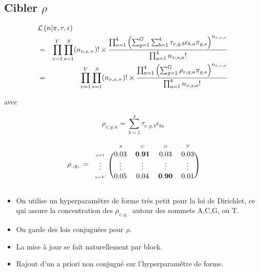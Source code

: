 \documentclass{beamer}
\begin{document}
\subsection{Cibler $\rho$}

\begin{frame}


\begin{eqnarray*}\lefteqn{\mathcal{L}\left(n | \pi, \tau,\epsilon \right)}\nonumber\\& =& \prod_{v=1}^{V} \prod_{s = 1}^{S} (n_{v,s,+})!\times\frac{\prod_{a = 1}^{4} \left( \sum_{g = 1}^{G}\sum_{b=1}^{4} \tau_{v,g,b}\epsilon_{b,a} \pi_{g,s}  \right)^{n_{v,s,a}}}{\prod_{a = 1}^{4}n_{v,s,a}!}\nonumber\\
& =&\prod_{v=1}^{V} \prod_{s = 1}^{S} (n_{v,s,+})!\times\frac{\prod_{a = 1}^{4} \left( \sum_{g = 1}^{G} \rho_{v,g,a} \pi_{g,s}  \right)^{n_{v,s,a}}}{\prod_{a = 1}^{4}n_{v,s,a}!}\end{eqnarray*}

avec

$$\rho_{v,g,a}=\sum_{b=1}^4\tau_{v,g,b}\epsilon_{ba}$$
\end{frame}
\begin{frame}
 $$\rho_{.,g,.}=\begin{blockarray}{ccccc}
    &\scriptscriptstyle A&\scriptscriptstyle C&\scriptscriptstyle G&\scriptscriptstyle T\\
    \begin{block}{c(cccc)}
 {\scriptscriptstyle v=1}&0.03&\mathbf{0.91}&0.03&0.03\\   
 {\scriptscriptstyle 
 \vdots}&\vdots&\vdots&\vdots&\vdots\\   
  {\scriptscriptstyle 
 v=V}&0.05&0.04&\mathbf{0.90}&0.01\\   
    \end{block}
\end{blockarray} $$
\begin{itemize}
\item On utilise un hyperparamêtre de forme très petit pour la loi de Dirichlet, ce qui assure la concentration des $\rho_{v,g,.}$ autour des sommets A,C,G, ou T.
\item On garde des lois conjuguées pour $\rho$.
\item La mise à jour se fait naturellement par block.
\item Rajout d'un a priori non conjugué sur l'hyperparamêtre de forme.
\end{itemize}
\end{frame}
\end{document}
